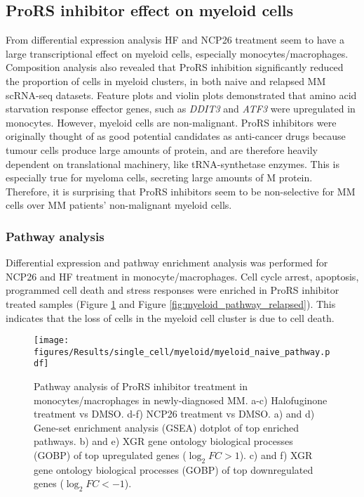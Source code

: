 \subsection{ProRS inhibitor effect on myeloid cells}
From differential expression analysis HF and NCP26 treatment seem to have a large transcriptional effect on myeloid cells, especially monocytes/macrophages.
Composition analysis also revealed that ProRS inhibition significantly reduced the proportion of cells in myeloid clusters, in both naive and relapsed MM scRNA-seq datasets.
Feature plots and violin plots demonstrated that amino acid starvation response effector genes, such as \textit{DDIT3} and \textit{ATF3} were upregulated in monocytes.
However, myeloid cells are non-malignant.
ProRS inhibitors were originally thought of as good potential candidates as anti-cancer drugs because tumour cells produce large amounts of protein, and are therefore heavily dependent on translational machinery, like tRNA-synthetase enzymes.
This is especially true for myeloma cells, secreting large amounts of M protein.
Therefore, it is surprising that ProRS inhibitors seem to be non-selective for MM cells over MM patients' non-malignant myeloid cells.


\subsubsection{Pathway analysis}
Differential expression and pathway enrichment analysis was performed for NCP26 and HF treatment in monocyte/macrophages.
Cell cycle arrest, apoptosis, programmed cell death and stress responses were enriched in ProRS inhibitor treated samples (Figure \ref{fig:myeloid_pathway_naive} and Figure \ref{fig:myeloid_pathway_relapsed}).
This indicates that the loss of cells in the myeloid cell cluster is due to cell death.
\begin{figure}[htb]
\centering
\texttt{[image: figures/Results/single\_cell/myeloid/myeloid\_naive\_pathway.pdf]}
\caption[Myeloid cell pathway analysis- newly diagnosed MM]{Pathway analysis of ProRS inhibitor treatment in monocytes/macrophages in newly-diagnosed MM.
a-c) Halofuginone treatment vs DMSO.
d-f) NCP26 treatment vs DMSO.
a) and d) Gene-set enrichment analysis (GSEA) dotplot of top enriched pathways.
b) and e) XGR gene ontology biological processes (GOBP) of top upregulated genes ($\log_{2}FC >1$).
c) and f) XGR gene ontology biological processes (GOBP) of top downregulated genes ($\log_{2}FC < -1$).
}
\label{fig:myeloid_pathway_naive}
\end{figure}


